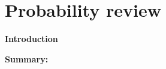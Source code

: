 \documentclass[10pt]{article}
\begin{document}
	
	\section*{Probability review}
	
	\begin{minipage}[t]{0.4\textwidth}
		\textbf{}
		\vspace{0.3cm}
		
		 
		 
	\end{minipage}
	\hfill
	\begin{minipage}[t]{0.58\textwidth}
		\textbf{Introduction}
		\vspace{0.3cm}\\
		
	\end{minipage}
	
	\vspace{1cm}
	\noindent\textbf{Summary:}
\end{document}
